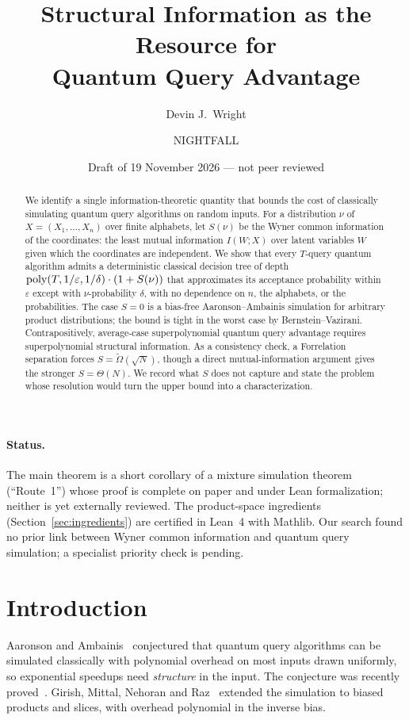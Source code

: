 \documentclass[11pt]{article}
\title{Structural Information as the Resource for\\Quantum Query Advantage}
\author{Devin J.\ Wright \and NIGHTFALL}
\date{Draft of 19 November 2026 --- not peer reviewed}
\theoremstyle{definition}\newtheorem{definition}[theorem]{Definition}\newtheorem{problem}{Open Problem}
\theoremstyle{remark}\newtheorem{remark}[theorem]{Remark}
\begin{document}
\maketitle
\begin{abstract}
We identify a single information-theoretic quantity that bounds the cost of classically simulating quantum query algorithms on random inputs. For a distribution $\nu$ of $X=(X_1,\dots,X_n)$ over finite alphabets, let $S(\nu)$ be the Wyner common information of the coordinates: the least mutual information $I(W;X)$ over latent variables $W$ given which the coordinates are independent. We show that every $T$-query quantum algorithm admits a deterministic classical decision tree of depth $\mathrm{poly}(T,1/\varepsilon,1/\delta)\cdot(1+S(\nu))$ that approximates its acceptance probability within $\varepsilon$ except with $\nu$-probability $\delta$, with no dependence on $n$, the alphabets, or the probabilities. The case $S=0$ is a bias-free Aaronson--Ambainis simulation for arbitrary product distributions; the bound is tight in the worst case by Bernstein--Vazirani. Contrapositively, average-case superpolynomial quantum query advantage requires superpolynomial structural information. As a consistency check, a Forrelation separation forces $S=\tilde\Omega(\sqrt N)$, though a direct mutual-information argument gives the stronger $S=\Theta(N)$. We record what $S$ does not capture and state the problem whose resolution would turn the upper bound into a characterization.
\end{abstract}

\paragraph{Status.} The main theorem is a short corollary of a mixture simulation theorem (``Route~1'') whose proof is complete on paper and under Lean formalization; neither is yet externally reviewed. The product-space ingredients (Section~\ref{sec:ingredients}) are certified in Lean~4 with Mathlib. Our search found no prior link between Wyner common information and quantum query simulation; a specialist priority check is pending.

\section{Introduction}
Aaronson and Ambainis~\cite{AA14} conjectured that quantum query algorithms can be simulated classically with polynomial overhead on most inputs drawn uniformly, so exponential speedups need \emph{structure} in the input. The conjecture was recently proved~\cite{Tur26,HMP26}. Girish, Mittal, Nehoran and Raz~\cite{GMNR26} extended the simulation to biased products and slices, with overhead polynomial in the inverse bias.
\end{document}
